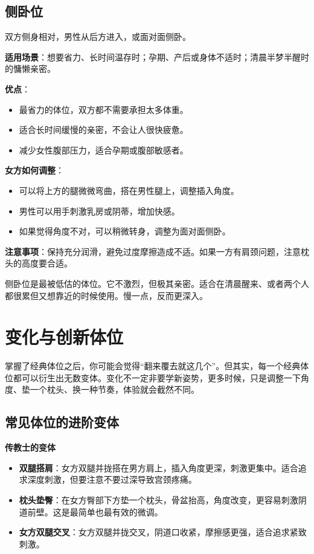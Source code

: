 \documentclass[12pt,UTF8]{ctexbook}
\begin{document}
\section{侧卧位}

双方侧身相对，男性从后方进入，或面对面侧卧。

\textbf{适用场景}：想要省力、长时间温存时；孕期、产后或身体不适时；清晨半梦半醒时的慵懒亲密。

\textbf{优点}：
\begin{itemize}
\item 最省力的体位，双方都不需要承担太多体重。
\item 适合长时间缓慢的亲密，不会让人很快疲惫。
\item 减少女性腹部压力，适合孕期或腹部敏感者。
\end{itemize}

\textbf{女方如何调整}：
\begin{itemize}
\item 可以将上方的腿微微弯曲，搭在男性腿上，调整插入角度。
\item 男性可以用手刺激乳房或阴蒂，增加快感。
\item 如果觉得角度不对，可以稍微转身，调整为面对面侧卧。
\end{itemize}

\textbf{注意事项}：保持充分润滑，避免过度摩擦造成不适。如果一方有肩颈问题，注意枕头的高度要合适。

\begin{tcolorbox}[colback=pink!5!white,colframe=red!50!black,title=贴心小叮咛]
侧卧位是最被低估的体位。它不激烈，但极其亲密。适合在清晨醒来、或者两个人都很累但又想靠近的时候使用。慢一点，反而更深入。
\end{tcolorbox}

\chapter{变化与创新体位}

掌握了经典体位之后，你可能会觉得“翻来覆去就这几个”。但其实，每一个经典体位都可以衍生出无数变体。变化不一定非要学新姿势，更多时候，只是调整一下角度、垫一个枕头、换一种节奏，体验就会截然不同。

\section{常见体位的进阶变体}

\textbf{传教士的变体}

\begin{itemize}
\item \textbf{双腿搭肩}：女方双腿并拢搭在男方肩上，插入角度更深，刺激更集中。适合追求深度刺激，但要注意不要过深导致宫颈疼痛。
\item \textbf{枕头垫臀}：在女方臀部下方垫一个枕头，骨盆抬高，角度改变，更容易刺激阴道前壁。这是最简单也最有效的微调。
\item \textbf{女方双腿交叉}：女方双腿并拢交叉，阴道口收紧，摩擦感更强，适合追求紧致刺激。
\end{itemize}
\end{document}
